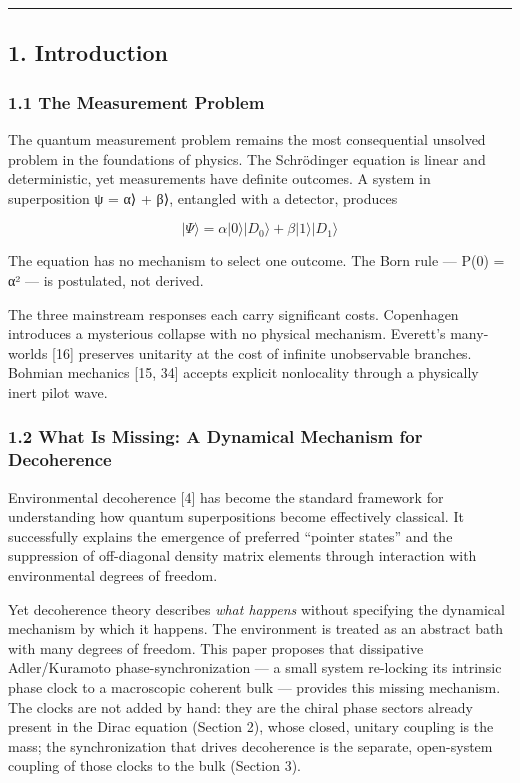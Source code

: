 \documentclass[
]{article}
\begin{document}
\begin{center}\rule{0.5\linewidth}{0.5pt}\end{center}

\subsection{1. Introduction}\label{introduction}

\subsubsection{1.1 The Measurement
Problem}\label{the-measurement-problem}

The quantum measurement problem remains the most consequential unsolved
problem in the foundations of physics. The Schrödinger equation is
linear and deterministic, yet measurements have definite outcomes. A
system in superposition ψ = α⟩ + β⟩, entangled with a
detector, produces

\[|\Psi\rangle = \alpha|0\rangle|D_0\rangle + \beta|1\rangle|D_1\rangle\]

The equation has no mechanism to select one outcome. The Born rule ---
P(0) = \textbar α\textbar² --- is postulated, not derived.

The three mainstream responses each carry significant costs. Copenhagen
introduces a mysterious collapse with no physical mechanism. Everett's
many-worlds {[}16{]} preserves unitarity at the cost of infinite
unobservable branches. Bohmian mechanics {[}15, 34{]} accepts explicit
nonlocality through a physically inert pilot wave.

\subsubsection{1.2 What Is Missing: A Dynamical Mechanism for
Decoherence}\label{what-is-missing-a-dynamical-mechanism-for-decoherence}

Environmental decoherence {[}4{]} has become the standard framework for
understanding how quantum superpositions become effectively classical.
It successfully explains the emergence of preferred ``pointer states''
and the suppression of off-diagonal density matrix elements through
interaction with environmental degrees of freedom.

Yet decoherence theory describes \emph{what happens} without specifying
the dynamical mechanism by which it happens. The environment is treated
as an abstract bath with many degrees of freedom. This paper proposes
that dissipative Adler/Kuramoto phase-synchronization --- a small system
re-locking its intrinsic phase clock to a macroscopic coherent bulk ---
provides this missing mechanism. The clocks are not added by hand: they
are the chiral phase sectors already present in the Dirac equation
(Section 2), whose closed, unitary coupling is the mass; the
synchronization that drives decoherence is the separate, open-system
coupling of those clocks to the bulk (Section 3).
\end{document}
